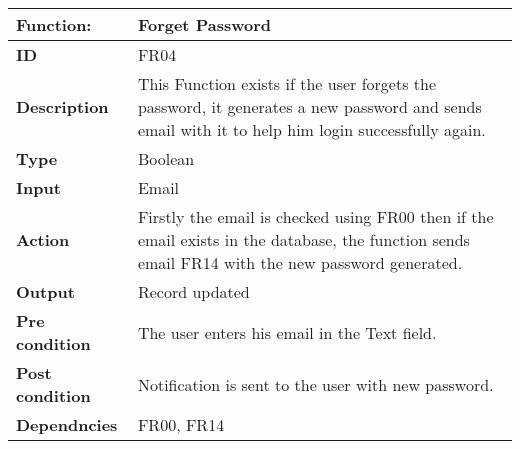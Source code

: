 \documentclass[]{article}
\begin{document}
\FloatBarrier
\begin{table}[h]
\caption{ }
\label{tab:my-table}
\begin{tabular}{|p{}|p{}|}
\hline
\textbf{Function:} & Forget Password
\\ \hline
\textbf{ID}  &            FR04

\\ \hline
\textbf{Description}    &       This Function exists if the user forgets the password, it generates a new password and sends email with it to help him login successfully again.                                                               
\\ \hline
\textbf{Type}    &       Boolean  

\\ \hline
\textbf{Input}        & Email


\\ \hline
\textbf{Action}            & Firstly the email is checked using FR00 then if the email exists in the database, the function sends email FR14 with the new password generated.

\\ \hline
\textbf{Output}            & Record updated

\\ \hline
\textbf{Pre condition}           &   The user enters his email in the Text field.

\\ \hline
\textbf{Post condition}     & Notification is sent to the user with new password.


\\ \hline
\textbf{Dependncies}           & FR00, FR14
\\ \hline
\end{tabular}
\end{table}
\end{document}
